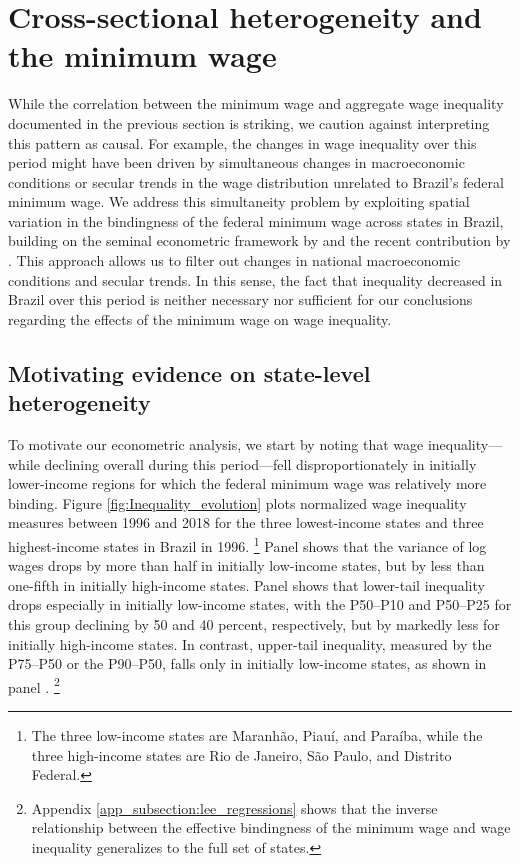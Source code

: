 
\section{Cross-sectional heterogeneity and the minimum wage\label{SECTION: Empirics}}

While the correlation between the minimum wage and aggregate wage inequality documented in the previous section is striking, we caution against interpreting this pattern as causal. For example, the changes in wage inequality over this period might have been driven by simultaneous changes in macroeconomic conditions or secular trends in the wage distribution unrelated to Brazil's federal minimum wage. We address this simultaneity problem by exploiting spatial variation in the bindingness of the federal minimum wage across states in Brazil, building on the seminal econometric framework by \citet{Lee1999} and the recent contribution by \citet{Autor2016}. This approach allows us to filter out changes in national macroeconomic conditions and secular trends. In this sense, the fact that inequality decreased in Brazil over this period is neither necessary nor sufficient for our conclusions regarding the effects of the minimum wage on wage inequality.


\subsection{Motivating evidence on state-level heterogeneity}

To motivate our econometric analysis, we start by noting that wage inequality---while declining overall during this period---fell disproportionately in initially lower-income regions for which the federal minimum wage was relatively more binding. Figure \ref{fig:Inequality_evolution} plots normalized wage inequality measures between 1996 and 2018 for the three lowest-income states and three highest-income states in Brazil in 1996.%
%
\footnote{The three low-income states are Maranh{\~{a}}o, Piau{\'{i}}, and Para{\'{i}}ba, while the three high-income states are Rio de Janeiro, S{\~{a}}o Paulo, and Distrito Federal.} %
%
Panel  shows that the variance of log wages drops by more than half in initially low-income states, but by less than one-fifth in initially high-income states. Panel  shows that lower-tail inequality drops especially in initially low-income states, with the P50--P10 and P50--P25 for this group declining by 50 and 40 percent, respectively, but by markedly less for initially high-income states. In contrast, upper-tail inequality, measured by the P75--P50 or the P90--P50, falls only in initially low-income states, as shown in panel .%
%
\footnote{Appendix \ref{app_subsection:lee_regressions} shows that the inverse relationship between the effective bindingness of the minimum wage and wage inequality generalizes to the full set of states.} %
%

